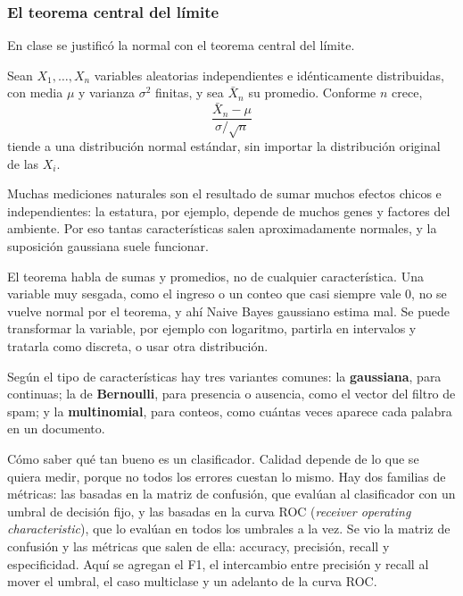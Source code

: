 \documentclass[11pt,letterpaper]{article}
\begin{document}
\subsubsection*{El teorema central del límite}

En clase se justificó la normal con el teorema central del límite.

\begin{teorema}
    Sean $X_1, \dots, X_n$ variables aleatorias independientes e
    idénticamente distribuidas, con media $\mu$ y varianza
    $\sigma^2$ finitas, y sea $\bar{X}_n$ su promedio. Conforme $n$
    crece,
    \[
        \frac{\bar{X}_n - \mu}{\sigma / \sqrt{n}}
    \]
    tiende a una distribución normal estándar, sin importar la
    distribución original de las $X_i$.
\end{teorema}

Muchas mediciones naturales son el resultado de sumar muchos efectos
chicos e independientes: la estatura, por ejemplo, depende de muchos
genes y factores del ambiente. Por eso tantas características salen
aproximadamente normales, y la suposición gaussiana suele funcionar.

\begin{ojo}
    El teorema habla de sumas y promedios, no de cualquier
    característica. Una variable muy sesgada, como el ingreso o un
    conteo que casi siempre vale $0$, no se vuelve normal por el
    teorema, y ahí Naive Bayes gaussiano estima mal. Se puede
    transformar la variable, por ejemplo con logaritmo, partirla en
    intervalos y tratarla como discreta, o usar otra distribución.
\end{ojo}

Según el tipo de características hay tres variantes comunes: la
\textbf{gaussiana}, para continuas; la de \textbf{Bernoulli}, para
presencia o ausencia, como el vector del filtro de spam; y la
\textbf{multinomial}, para conteos, como cuántas veces aparece cada
palabra en un documento.


\newpage



\begin{quick_sum}
    Cómo saber qué tan bueno es un clasificador. Calidad depende de lo
    que se quiera medir, porque no todos los errores cuestan lo mismo.
    Hay dos familias de métricas: las basadas en la matriz de
    confusión, que evalúan al clasificador con un umbral de decisión
    fijo, y las basadas en la curva ROC (\textit{receiver operating
    characteristic}), que lo evalúan en todos los umbrales a la vez.
    Se vio la matriz de confusión y las métricas que salen de ella:
    accuracy, precisión, recall y especificidad. Aquí se agregan el
    F1, el intercambio entre precisión y recall al mover el umbral, el
    caso multiclase y un adelanto de la curva ROC.
\end{quick_sum}
\end{document}
